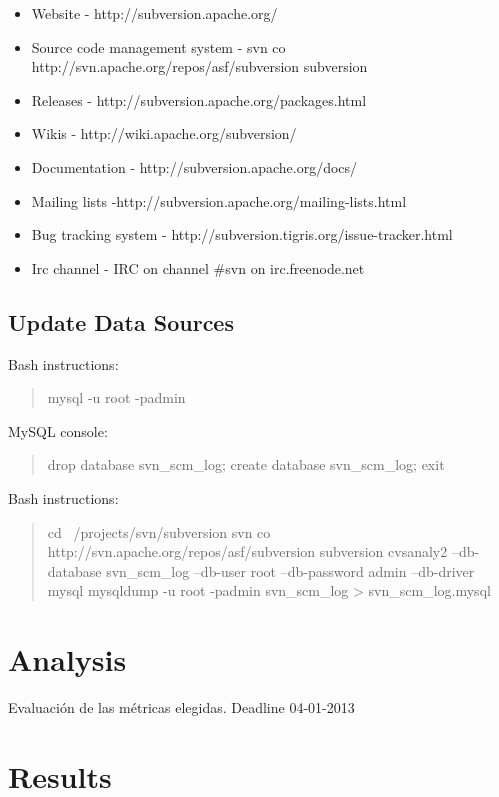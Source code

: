 \documentclass[11pt]{scrartcl}
\begin{document}
\begin{itemize}
    \item Website - http://subversion.apache.org/
    \item Source code management system - svn co http://svn.apache.org/repos/asf/subversion subversion
    \item Releases - http://subversion.apache.org/packages.html
    \item Wikis - http://wiki.apache.org/subversion/
    \item Documentation - http://subversion.apache.org/docs/
    \item Mailing lists -http://subversion.apache.org/mailing-lists.html
    \item Bug tracking system - http://subversion.tigris.org/issue-tracker.html
    \item Irc channel - IRC on channel \#svn on irc.freenode.net
\end{itemize}

\subsection{Update Data Sources}

Bash instructions:

\begin{quote}
    mysql -u root -padmin
\end{quote}

MySQL console:

\begin{quote}
    drop database svn\_scm\_log;
    create database svn\_scm\_log;
    exit
\end{quote}

Bash instructions:

\begin{quote}
    cd ~/projects/svn/subversion
    svn co http://svn.apache.org/repos/asf/subversion subversion
    cvsanaly2 --db-database svn\_scm\_log --db-user root --db-password admin --db-driver mysql
    mysqldump -u root -padmin svn\_scm\_log > svn\_scm\_log.mysql
\end{quote}

\section{Analysis}

Evaluación de las métricas elegidas.
Deadline 04-01-2013

\section{Results}
\end{document}
